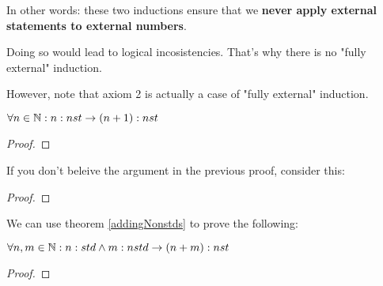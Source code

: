 In other words: these two inductions ensure that we \textbf{never apply external statements to external numbers}. 

Doing so would lead to logical incosistencies. That's why there is no "fully external" induction.

However, note that axiom 2 is actually a case of "fully external" induction.


\begin{theorem}
    $ \forall n \in \mathbb{N}: n:nst \to (n+1):nst $ \label{addingNonstds}
\end{theorem}
\begin{proof}
\end{proof}

If you don't beleive the argument in the previous proof, consider this: 
\begin{proof}
\end{proof}


We can use theorem \ref{addingNonstds} to prove the following: 

\begin{theorem}
    $\forall n, m \in \mathbb{N}: n:std \land m:nstd \to (n+m):nst$
\end{theorem}
\begin{proof}
\end{proof}

